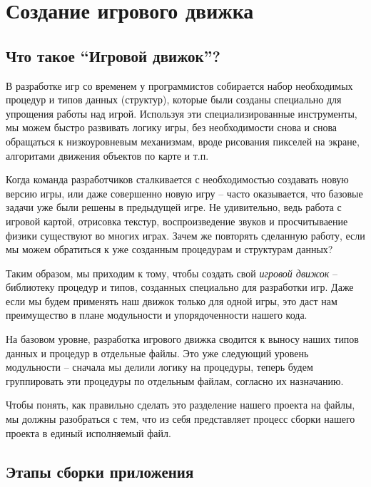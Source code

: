 \documentclass[../sparc.tex]{subfiles}
\begin{document}
\newpage
\section{Создание игрового движка}

\subsection{Что такое ``Игровой движок''?}
В разработке игр со временем у программистов собирается набор необходимых
процедур и типов данных (структур), которые были созданы специально для
упрощения работы над игрой.  Используя эти специализированные инструменты, мы
можем быстро развивать логику игры, без необходимости снова и снова обращаться к
низкоуровневым механизмам, вроде рисования пикселей на экране, алгоритами
движения объектов по карте и т.п.

Когда команда разработчиков сталкивается с необходимостью создавать новую версию
игры, или даже совершенно новую игру -- часто оказывается, что базовые задачи уже
были решены в предыдущей игре.  Не удивительно, ведь работа с игровой картой,
отрисовка текстур, воспроизведение звуков и просчитываение физики существуют во
многих играх.  Зачем же повторять сделанную работу, если мы можем обратиться к
уже созданным процедурам и структурам данных?

Таким образом, мы приходим к тому, чтобы создать свой \emph{игровой движок} --
библиотеку процедур и типов, созданных специально для разработки игр.  Даже если
мы будем применять наш движок только для одной игры, это даст нам преимущество в
плане модульности и упорядоченности нашего кода.

На базовом уровне, разработка игрового движка сводится к выносу наших типов
данных и процедур в отдельные файлы.  Это уже следующий уровень модульности --
сначала мы делили логику на процедуры, теперь будем группировать эти процедуры
по отдельным файлам, согласно их назначанию.

Чтобы понять, как правильно сделать это разделение нашего проекта на файлы, мы
должны разобраться с тем, что из себя представляет процесс сборки нашего проекта
в единый исполняемый файл.

\subsection{Этапы сборки приложения}
\end{document}
